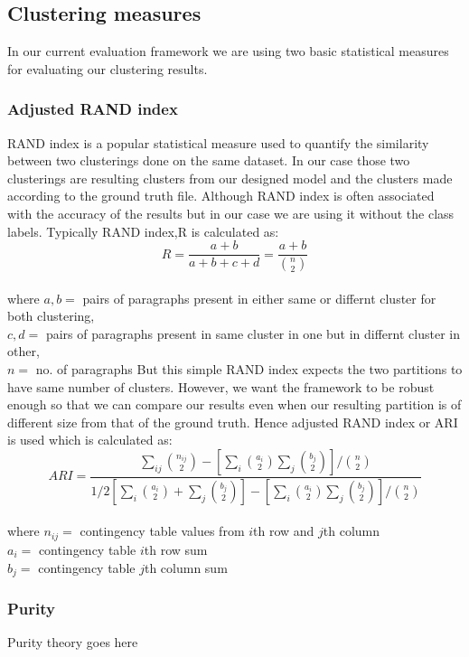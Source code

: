 \subsection{Clustering measures}
\label{sec:4}
In our current evaluation framework we are using two basic statistical measures for evaluating our clustering results.
\subsubsection{Adjusted RAND index}
\label{sec:5}
RAND index is a popular statistical measure used to quantify the similarity between two clusterings done on the same dataset. In our case those two clusterings are resulting clusters from our designed model and the clusters made according to the ground truth file. Although RAND index is often associated with the accuracy of the results but in our case we are using it without the class labels. Typically RAND index,R is calculated as:
\begin{equation}
R = \frac{a+b}{a+b+c+d} = \frac{a+b}{{{n}\choose{2}}} 
\end{equation}
\\where $a,b = $ pairs of paragraphs present in either same or differnt cluster for both clustering,
\\$c,d = $ pairs of paragraphs present in same cluster in one but in differnt cluster in other,
\\$n = $ no. of paragraphs
But this simple RAND index expects the two partitions to have same number of clusters. However, we want the framework to be robust enough so that we can compare our results even when our resulting partition is of different size from that of the ground truth. Hence adjusted RAND index or ARI is used which is calculated as:
\begin{equation}
ARI = \frac{\sum_{ij}{{n_{ij}}\choose{2}}-[\sum_{i}{a_{i}\choose{2}}\sum_{j}{b_{j}\choose{2}}]/{{n}\choose{2}}}{1/2[\sum_{i}{a_{i}\choose{2}}+\sum_{j}{b_{j}\choose{2}}]-[\sum_{i}{a_{i}\choose{2}}\sum_{j}{b_{j}\choose{2}}]/{{n}\choose{2}}}
\end{equation}
\\where $n_{ij}=$ contingency table values from $i$th row and $j$th column
\\$a_{i}=$ contingency table $i$th row sum
\\$b_{j}=$ contingency table $j$th column sum
\subsubsection{Purity}
Purity theory goes here
